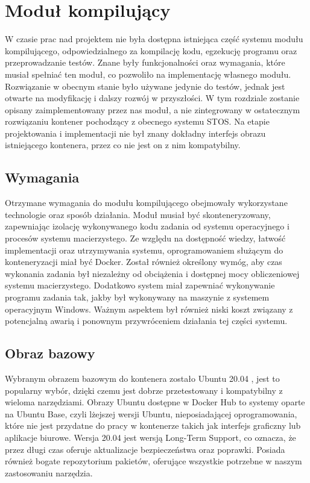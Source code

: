 \section{Moduł kompilujący}
W czasie prac nad projektem nie była dostępna istniejąca część systemu modułu kompilującego, odpowiedzialnego za kompilację kodu, egzekucję programu oraz przeprowadzanie testów. Znane były funkcjonalności oraz wymagania, które musiał spełniać ten moduł, co pozwoliło na implementację własnego modułu. Rozwiązanie w obecnym stanie było używane jedynie do testów, jednak jest otwarte na modyfikację i dalszy rozwój w przyszłości. W tym rozdziale zostanie opisany zaimplementowany przez nas moduł, a nie zintegrowany w ostatecznym rozwiązaniu kontener pochodzący z obecnego systemu STOS. Na etapie projektowania i implementacji nie był znany dokładny interfejs obrazu istniejącego kontenera, przez co nie jest on z nim kompatybilny. 

\subsection{Wymagania}
Otrzymane wymagania do modułu kompilującego obejmowały wykorzystane technologie oraz sposób działania. Moduł musiał być skonteneryzowany, zapewniając izolację wykonywanego kodu zadania od systemu operacyjnego i procesów systemu macierzystego. Ze względu na dostępność wiedzy, łatwość implementacji oraz utrzymywania systemu, oprogramowaniem służącym do konteneryzacji miał być Docker. Został również określony wymóg, aby czas wykonania zadania był niezależny od obciążenia i dostępnej mocy obliczeniowej systemu macierzystego. Dodatkowo system miał zapewniać wykonywanie programu zadania tak, jakby był wykonywany na maszynie z systemem operacyjnym Windows. Ważnym aspektem był również niski koszt związany z potencjalną awarią i ponownym przywróceniem działania tej części systemu.

\subsection{Obraz bazowy}
Wybranym obrazem bazowym do kontenera zostało Ubuntu 20.04 \cite{linuxUbuntu}, jest to popularny wybór, dzięki czemu jest dobrze przetestowany i kompatybilny z wieloma narzędziami. Obrazy Ubuntu dostępne w Docker Hub to systemy oparte na Ubuntu Base, czyli lżejszej wersji Ubuntu, nieposiadającej oprogramowania, które nie jest przydatne do pracy w kontenerze takich jak interfejs graficzny lub aplikacje biurowe. Wersja 20.04 jest wersją Long-Term Support, co oznacza, że przez długi czas oferuje aktualizacje bezpieczeństwa oraz poprawki. Posiada również bogate repozytorium pakietów, oferujące wszystkie potrzebne w naszym zastosowaniu narzędzia.

